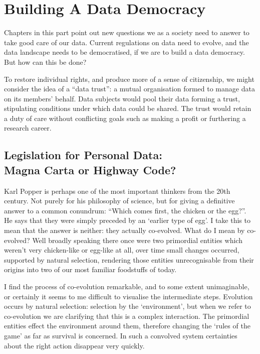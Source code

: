 \documentclass[a4paper]{caesar_book}
\let\oldchapter\chapter
\def\chapter{%
  \setcounter{footnote}{0}%
  \oldchapter
}
\begin{document}
\part{Building A Data Democracy}

Chapters in this part point out new questions we as a society need to answer to take good care of our data. Current regulations on data need to evolve, and the data landscape needs to be democratised, if we are to build a data democracy. But how can this be done?

To restore individual rights, and produce more of a sense of citizenship, we might consider the idea of a “data trust”: a mutual organisation formed to manage data on its members’ behalf. Data subjects would pool their data forming a trust, stipulating conditions under which data could be shared. The trust would retain a duty of care without conflicting goals such as making a profit or furthering a research career.

\chapter{Legislation for Personal Data:\\Magna Carta or Highway Code?}

Karl Popper is perhaps one of the most important thinkers from the 20th century. Not purely for his philosophy of science, but for giving a definitive answer to a common conundrum: ``Which comes first, the chicken or the egg?''. He says that they were simply preceded by an ‘earlier type of egg’. I take this to mean that the answer is neither: they actually co-evolved. What do I mean by co-evolved? Well broadly speaking there once were two primordial entities which weren't very chicken-like or egg-like at all, over time small changes occurred, supported by natural selection, rendering those entities unrecognisable from their origins into two of our most familiar foodstuffs of today.

I find the process of co-evolution remarkable, and to some extent unimaginable, or certainly it seems to me difficult to visualise the intermediate steps. Evolution occurs by natural selection: selection by the ‘environment’, but when we refer to co-evolution we are clarifying that this is a complex interaction. The primordial entities effect the environment around them, therefore changing the ‘rules of the game’ as far as survival is concerned. In such a convolved system certainties about the right action disappear very quickly.
\end{document}
